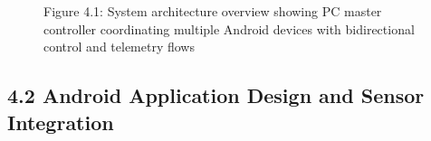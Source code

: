 \documentclass[12pt,a4paper]{article}
\begin{document}
\begin{figure}
\centering
{}
\caption{Figure 4.1: System architecture overview showing PC master controller coordinating multiple Android devices with bidirectional control and telemetry flows}
\end{figure}

\subsection{4.2 Android Application Design and Sensor Integration}\label{android-application-design-and-sensor-integration}
\end{document}
